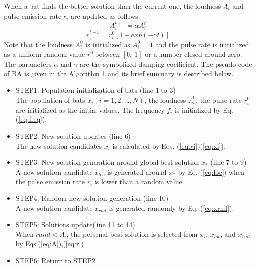 \documentclass[conference]{IEEEtran}
\begin{document}
When a bat finds the better solution than the current one, the loudness $A_i$ and pulse emission rate $r_i$ are updated as follows:
\begin{equation}
A_i^{t+1}=\alpha A_i^t
\label{eq:A}
\end{equation}
\begin{equation}
r_i^{t+1}=r_i^0[1-exp(-\gamma t)]
\label{eq:r}
\end{equation}
Note that the loudness $A_i^0$ is initialized as $A_i^0=1$ and the pulse rate is initialized as a uniform random value $r^0$ between $[0, \ 1]$ or a number closed around zero. The parameters $\alpha$ and $\gamma$ are the symbolized damping coefficient. The pseudo code of BA is given in the Algorithm 1 and its brief summary is described below.

\begin{itemize}
\item STEP1: Population initialization of bats (line 1 to 3)\\
The population of bats ${x_i}(i=1, 2, ..., N)$, the loudness ${A_i^0}$, the pulse rate ${r_i^0}$ are initialized as the initial values. The frequency ${f_i}$ is initialized by Eq.(\ref{eq:freq}).
\item STEP2: New solution updates (line 6)\\
The new solution candidates ${x_i}$ is calculated by Eqs. (\ref{eq:vi})(\ref{eq:xi}).
\item STEP3: New solution generation around global best solution ${x_*}$ (line 7 to 9)\\
A new solution candidate $x_{loc}$ is generated around $x_*$ by Eq. (\ref{eq:loc}) when the pulse emission rate $r_i$ is lower than a random value.
\item STEP4: Random new solution generation (line 10)\\
A new solution candidate ${x_{rnd}}$ is generated randomly by Eq. (\ref{eq:xrnd}).  
\item STEP5: Solutions update(line 11 to 14)\\
When ${rand < A_i}$, the personal best solution is selected from $x_i$, ${x_{loc}}$, and ${x_{rnd}}$ by Eqs.(\ref{eq:A}),(\ref{eq:r})
\item STEP6: Return to STEP2 
\end{itemize}
\end{document}
